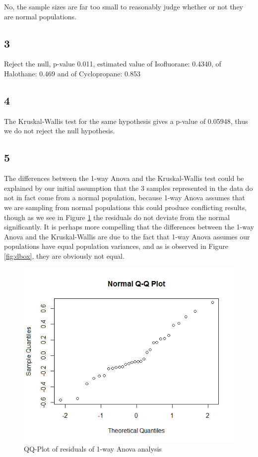 \documentclass{article}
\begin{document}
    No, the sample sizes are far too small to reasonably judge whether or not they are normal populations.
    \subsection*{3}
    Reject the null, p-value 0.011, estimated value of Isofluorane: 0.4340, of Halothane: 0.469 and of Cyclopropane: 0.853
    \subsection*{4}
    The Kruskal-Wallis test for the same hypothesis gives a p-value of 0.05948, thus we do not reject the null hypothesis. 
    \subsection*{5}
    The differences between the 1-way Anova and the Kruskal-Wallis test could be explained by our initial assumption that the 3 samples represented in the data do not in fact come from a normal population, because 1-way Anova assumes that we are sampling from normal populations this could produce conflicting results, though as we see in Figure \ref{fig:dog-resid} the residuals do not deviate from the normal significantly.
    It is perhaps more compelling that the differences between the 1-way Anova and the Kruskal-Wallis are due to the fact that 1-way Anova assumes our populations have equal population variances, and as is observed in Figure \ref{fig:dbox}, they are obviously not equal.
    
    \begin{figure}[!htb]
    \centering
      \includegraphics[scale=0.3]{../results/4_5.png}
      \caption{QQ-Plot of residuals of 1-way Anova analysis}
      \label{fig:dog-resid}
    \end{figure}
    
\end{document}
